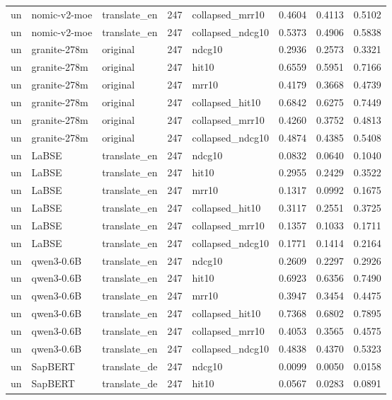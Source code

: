 \begin{tabular}{lllrlrrr}
un & nomic-v2-moe & translate\_en & 247 & collapsed\_mrr10 & 0.4604 & 0.4113 & 0.5102 \\
un & nomic-v2-moe & translate\_en & 247 & collapsed\_ndcg10 & 0.5373 & 0.4906 & 0.5838 \\
un & granite-278m & original & 247 & ndcg10 & 0.2936 & 0.2573 & 0.3321 \\
un & granite-278m & original & 247 & hit10 & 0.6559 & 0.5951 & 0.7166 \\
un & granite-278m & original & 247 & mrr10 & 0.4179 & 0.3668 & 0.4739 \\
un & granite-278m & original & 247 & collapsed\_hit10 & 0.6842 & 0.6275 & 0.7449 \\
un & granite-278m & original & 247 & collapsed\_mrr10 & 0.4260 & 0.3752 & 0.4813 \\
un & granite-278m & original & 247 & collapsed\_ndcg10 & 0.4874 & 0.4385 & 0.5408 \\
un & LaBSE & translate\_en & 247 & ndcg10 & 0.0832 & 0.0640 & 0.1040 \\
un & LaBSE & translate\_en & 247 & hit10 & 0.2955 & 0.2429 & 0.3522 \\
un & LaBSE & translate\_en & 247 & mrr10 & 0.1317 & 0.0992 & 0.1675 \\
un & LaBSE & translate\_en & 247 & collapsed\_hit10 & 0.3117 & 0.2551 & 0.3725 \\
un & LaBSE & translate\_en & 247 & collapsed\_mrr10 & 0.1357 & 0.1033 & 0.1711 \\
un & LaBSE & translate\_en & 247 & collapsed\_ndcg10 & 0.1771 & 0.1414 & 0.2164 \\
un & qwen3-0.6B & translate\_en & 247 & ndcg10 & 0.2609 & 0.2297 & 0.2926 \\
un & qwen3-0.6B & translate\_en & 247 & hit10 & 0.6923 & 0.6356 & 0.7490 \\
un & qwen3-0.6B & translate\_en & 247 & mrr10 & 0.3947 & 0.3454 & 0.4475 \\
un & qwen3-0.6B & translate\_en & 247 & collapsed\_hit10 & 0.7368 & 0.6802 & 0.7895 \\
un & qwen3-0.6B & translate\_en & 247 & collapsed\_mrr10 & 0.4053 & 0.3565 & 0.4575 \\
un & qwen3-0.6B & translate\_en & 247 & collapsed\_ndcg10 & 0.4838 & 0.4370 & 0.5323 \\
un & SapBERT & translate\_de & 247 & ndcg10 & 0.0099 & 0.0050 & 0.0158 \\
un & SapBERT & translate\_de & 247 & hit10 & 0.0567 & 0.0283 & 0.0891 \\

\end{tabular}
